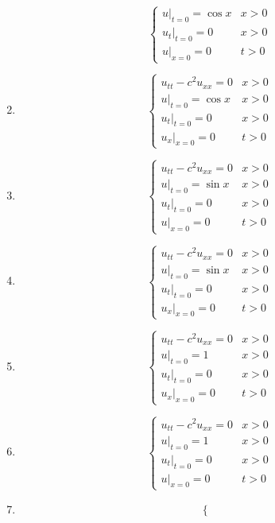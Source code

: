 \documentclass{article}
\theoremstyle{definition}
\newenvironment{boldenv}{\bfseries\boldmath}{}
\begin{document}
\begin{boldenv}
\begin{enumerate}[(1), start=9]
\[\begin{cases}
            u|_{t=0} = \cos{x} & x > 0\\
            u_t|_{t=0} = 0 & x > 0\\
            u|_{x = 0} = 0 & t > 0
        \end{cases}\]
        \item \[\begin{cases}
            u_{tt} - c^2u_{xx} = 0 & x > 0\\
            u|_{t=0} = \cos{x} & x > 0\\
            u_t|_{t=0} = 0 & x > 0\\
            u_x|_{x = 0} = 0 & t > 0
        \end{cases}\]
        \item \[\begin{cases}
            u_{tt} - c^2u_{xx} = 0 & x > 0\\
            u|_{t=0} = \sin{x} & x > 0\\
            u_t|_{t=0} = 0 & x > 0\\
            u|_{x = 0} = 0 & t > 0
        \end{cases}\]
        \item \[\begin{cases}
            u_{tt} - c^2u_{xx} = 0 & x > 0\\
            u|_{t=0} = \sin{x} & x > 0\\
            u_t|_{t=0} = 0 & x > 0\\
            u_x|_{x = 0} = 0 & t > 0
        \end{cases}\]
        \item \[\begin{cases}
            u_{tt} - c^2u_{xx} = 0 & x > 0\\
            u|_{t=0} = 1 & x > 0\\
            u_t|_{t=0} = 0 & x > 0\\
            u_x|_{x = 0} = 0 & t > 0
        \end{cases}\]
        \item \[\begin{cases}
            u_{tt} - c^2u_{xx} = 0 & x > 0\\
            u|_{t=0} = 1 & x > 0\\
            u_t|_{t=0} = 0 & x > 0\\
            u|_{x = 0} = 0 & t > 0
        \end{cases}\]
        \item \[\begin{cases}

\end{cases}\]
\end{enumerate}
\end{boldenv}
\end{document}
